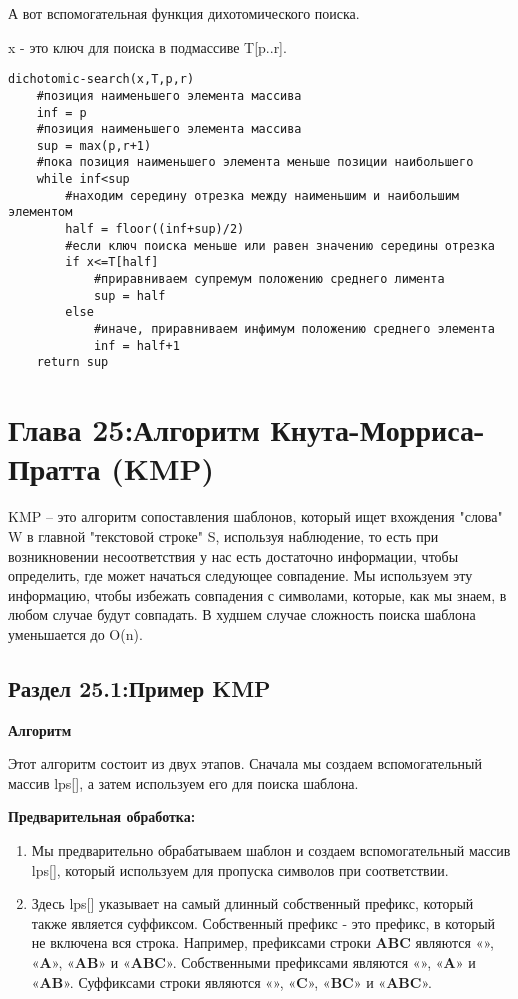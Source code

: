 А вот вспомогательная функция дихотомического поиска.

\vspace{\baselineskip}

x - это ключ для поиска в подмассиве T[p..r].

\begin{tcolorbox}
\begin{verbatim}
dichotomic-search(x,T,p,r)
	#позиция наименьшего элемента массива
	inf = p
	#позиция наименьшего элемента массива
	sup = max(p,r+1)
	#пока позиция наименьшего элемента меньше позиции наибольшего
	while inf<sup
		#находим середину отрезка между наименьшим и наибольшим элементом
		half = floor((inf+sup)/2)
		#если ключ поиска меньше или равен значению середины отрезка 
		if x<=T[half] 
			#приравниваем супремум положению среднего лимента
			sup = half
		else
			#иначе, приравниваем инфимум положению среднего элемента
			inf = half+1
	return sup
\end{verbatim}
\end{tcolorbox}

\chapter*{Глава 25:Алгоритм Кнута-Морриса-Пратта (KMP)}

KMP -- это алгоритм сопоставления шаблонов, который ищет вхождения "слова" W в главной "текстовой строке" S, используя наблюдение, то есть при возникновении несоответствия у нас есть достаточно информации, чтобы определить, где может начаться следующее совпадение. Мы используем эту информацию, чтобы избежать совпадения с символами, которые, как мы знаем, в любом случае будут совпадать. В худшем случае сложность поиска шаблона уменьшается до O(n).

\section*{Раздел 25.1:Пример KMP}

\textbf{Алгоритм}

\vspace{\baselineskip}

Этот алгоритм состоит из двух этапов. Сначала мы создаем вспомогательный массив lps[], а затем используем его для поиска шаблона.

\vspace{\baselineskip}

\textbf{Предварительная обработка:}
\begin{enumerate}
	\item Мы предварительно обрабатываем шаблон и создаем вспомогательный массив lps[], который используем для пропуска символов при соответствии. 
    \item Здесь lps[] указывает на самый длинный собственный префикс, который также является суффиксом. Собственный префикс - это префикс, в который не включена вся строка. Например, префиксами строки \textbf{ABC} являются «», «\textbf{A}», «\textbf{AB}» и «\textbf{ABC}». Собственными префиксами являются «», «\textbf{A}» и «\textbf{AB}». Суффиксами строки являются «», «\textbf{C}», «\textbf{BC}» и «\textbf{ABC}».
\end{enumerate}

